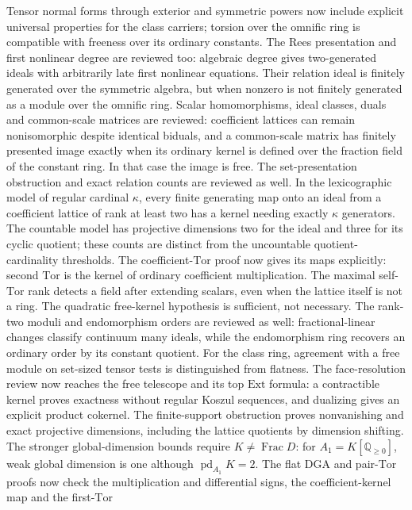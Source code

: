 \documentclass[11pt]{article}
\newcommand{\Q}{\mathbb{Q}}
\begin{document}
{Tensor normal forms through exterior and symmetric powers now include
explicit universal properties for the class carriers; torsion over the
omnific ring is compatible with freeness over its ordinary constants.
The Rees presentation and first nonlinear degree are reviewed too:
algebraic degree gives two-generated ideals with arbitrarily late first
nonlinear equations. Their relation ideal is finitely generated over the
symmetric algebra, but when nonzero is not finitely generated as a module
over the omnific ring.
Scalar homomorphisms, ideal classes, duals and common-scale matrices are
reviewed: coefficient lattices can remain nonisomorphic despite identical
biduals, and a common-scale matrix has finitely presented image exactly
when its ordinary kernel is defined over the fraction field of the
constant ring. In that case the image is free.
The set-presentation obstruction and exact relation counts are reviewed
as well. In the lexicographic model of regular cardinal $\kappa$, every
finite generating map onto an ideal from a coefficient lattice of rank
at least two has a kernel needing exactly $\kappa$ generators. The countable model has
projective dimensions two for the ideal and three for its cyclic quotient;
these counts are distinct from the uncountable quotient-cardinality thresholds.
The coefficient-$\mathrm{Tor}$ proof now gives its maps explicitly:
second $\mathrm{Tor}$ is the kernel of ordinary coefficient multiplication.
The maximal self-$\mathrm{Tor}$ rank detects a field after extending
scalars, even when the lattice itself is not a ring. The quadratic
free-kernel hypothesis is sufficient, not necessary.
The rank-two moduli and endomorphism orders are reviewed as well:
fractional-linear changes classify continuum many ideals, while the
endomorphism ring recovers an ordinary order by its constant quotient.
For the class ring, agreement with a free module on set-sized tensor
tests is distinguished from flatness.
The face-resolution review now reaches the free telescope and its top
$\mathrm{Ext}$ formula: a contractible kernel proves exactness without
regular Koszul sequences, and dualizing gives an explicit product cokernel.
The finite-support obstruction proves nonvanishing and exact projective
dimensions, including the lattice quotients by dimension shifting.
The stronger global-dimension bounds require $K\ne\operatorname{Frac}D$:
for $A_1=K[\Q_{\ge0}]$, weak global dimension is one although
$\operatorname{pd}_{A_1}K=2$.
The flat DGA and pair-$\mathrm{Tor}$ proofs now check the multiplication
and differential signs, the coefficient-kernel map and the first-$\mathrm{Tor}$
}
\end{document}
